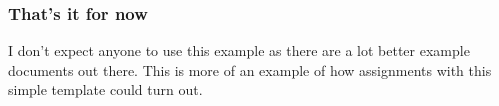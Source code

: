 \documentclass[a4paper]{article}
\newcommand{\ex}[1]{\subsubsection*{#1}}
\begin{document}
\ex{That's it for now}

I don't expect anyone to use this example as there are a lot better example
documents out there. This is more of an example of how assignments with this 
simple template could turn out.



%
\end{document}
